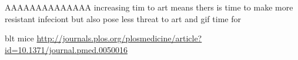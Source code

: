 \documentclass[DIV=15]{scrartcl}
\begin{document}
 
 
 
 AAAAAAAAAAAAAA
   increasing tim to art means thers is time to make more resistant infeciont but also pose less threat to art and gif time for 
   
   
   blt mice \url{http://journals.plos.org/plosmedicine/article?id=10.1371/journal.pmed.0050016}
 
 
 \fi
 
 

 


 
\end{document}
